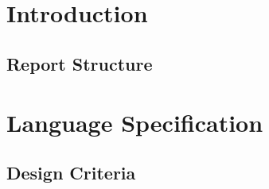 


\frontmatter %
\newcommand{\ind}[1]{}

\ind{FormaliaForside}
\cleardoublepage %

\ind{FormaliaTitelblad}
\cleardoublepage
\ind{FormaliaProlog.tex}
\\\\
\ind{FormaliaUnderskriftsside.tex}
\cleardoublepage



\setlength\parskip{0ex} %
\tableofcontents* %
\setlength{\parskip}{3mm} %



\label{marker}
\mainmatter

\pagestyle{custom}

\renewcommand{\ind}[1]{}
\chapter{Introduction}
\ind{Introduction}
\ind{EnviromentForThisProject}
\ind{SolutionInBars}
\ind{ProblemStatement}
\section{Report Structure}

\renewcommand{\ind}[1]{}
\chapter{Language Specification}
\label{chap:lanspec}
\ind{ParadigmsOfProgrammingLanguage}
\section{Design Criteria}
\ind{ProgrammingAnArduino-basedDrinks-machine}
\ind{DesignCriteriaInThisProject}
